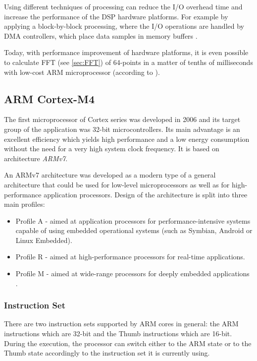 \documentclass[twoside]{ctuthesis}
\theoremstyle{plain}
\theoremstyle{definition}
\theoremstyle{note}
\begin{document}
Using different techniques of processing can reduce the I/O overhead time and increase the performance of the DSP hardware platforms. For example by applying a block-by-block processing, where the I/O operations are handled by DMA controllers, which place data samples in memory buffers \cite{cite:RT_DSP}.

Today, with performance improvement of hardware platforms, it is even possible to calculate FFT (see \ref{sec:FFT}) of 64-points in a matter of tenths of milliseconds with low-cost ARM microprocessor (according to \cite{cite:STM32_DSP_library}).
\subsection{ARM Cortex-M4}
\label{sec:ARM_M3}
The first microprocessor of Cortex series was developed in 2006 and its target group of the application was 32-bit microcontrollers. Its main advantage is an excellent efficiency which yields high performance and a low energy consumption without the need for a very high system clock frequency. It is based on architecture \textit{ARMv7}.

An ARMv7 architecture was developed as a modern type of a general architecture that could be used for low-level microprocessors as well as for high-performance application processors. Design of the architecture is split into three main profiles:
\begin{itemize}
	\setlength{\itemsep}{5pt}
	\item Profile A - aimed at application processors for performance-intensive systems capable of using embedded operational systems (such as Symbian, Android or Linux Embedded).
	\item Profile R - aimed at high-performance processors for real-time applications.
	\item Profile M - aimed at wide-range processors for deeply embedded applications \cite{cite:ARM-M3}.
\end{itemize}

\subsubsection{Instruction Set}
There are two instruction sets supported by ARM cores in general: the ARM instructions which are 32-bit and the Thumb instructions which are 16-bit. During the execution, the processor can switch either to the ARM state or to the Thumb state accordingly to the instruction set it is currently using.
\end{document}
